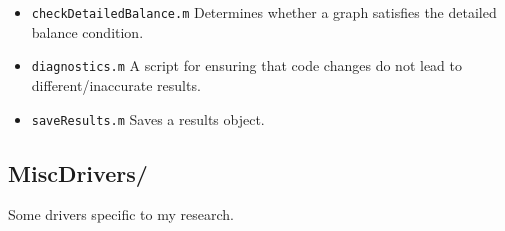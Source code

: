 \documentclass[11pt, oneside]{article}   	%
\theoremstyle{definition}
\begin{document}
\begin{itemize}
\item \texttt{checkDetailedBalance.m} Determines whether a graph satisfies the detailed balance condition.
\item \texttt{diagnostics.m} A script for ensuring that code changes do not lead to different/inaccurate results.
\item \texttt{saveResults.m} Saves a results object.
\end{itemize}

\subsection{MiscDrivers/}
Some drivers specific to my research.
\end{document}
